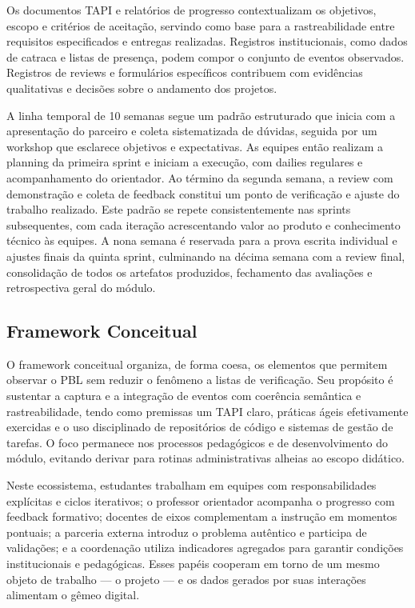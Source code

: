 \documentclass[12pt,a4paper]{article}
\begin{document}
Os documentos TAPI e relatórios de progresso contextualizam os objetivos, escopo e critérios de aceitação, servindo como base para a rastreabilidade entre requisitos especificados e entregas realizadas. Registros institucionais, como dados de catraca e listas de presença, podem compor o conjunto de eventos observados. Registros de reviews e formulários específicos contribuem com evidências qualitativas e decisões sobre o andamento dos projetos.

A linha temporal de 10 semanas segue um padrão estruturado que inicia com a apresentação do parceiro e coleta sistematizada de dúvidas, seguida por um workshop que esclarece objetivos e expectativas. As equipes então realizam a planning da primeira sprint e iniciam a execução, com dailies regulares e acompanhamento do orientador. Ao término da segunda semana, a review com demonstração e coleta de feedback constitui um ponto de verificação e ajuste do trabalho realizado. Este padrão se repete consistentemente nas sprints subsequentes, com cada iteração acrescentando valor ao produto e conhecimento técnico às equipes. A nona semana é reservada para a prova escrita individual e ajustes finais da quinta sprint, culminando na décima semana com a review final, consolidação de todos os artefatos produzidos, fechamento das avaliações e retrospectiva geral do módulo.

\subsection{Framework Conceitual}

O framework conceitual organiza, de forma coesa, os elementos que permitem observar o PBL sem reduzir o fenômeno a listas de verificação. Seu propósito é sustentar a captura e a integração de eventos com coerência semântica e rastreabilidade, tendo como premissas um TAPI claro, práticas ágeis efetivamente exercidas e o uso disciplinado de repositórios de código e sistemas de gestão de tarefas. O foco permanece nos processos pedagógicos e de desenvolvimento do módulo, evitando derivar para rotinas administrativas alheias ao escopo didático.

Neste ecossistema, estudantes trabalham em equipes com responsabilidades explícitas e ciclos iterativos; o professor orientador acompanha o progresso com feedback formativo; docentes de eixos complementam a instrução em momentos pontuais; a parceria externa introduz o problema autêntico e participa de validações; e a coordenação utiliza indicadores agregados para garantir condições institucionais e pedagógicas. Esses papéis cooperam em torno de um mesmo objeto de trabalho — o projeto — e os dados gerados por suas interações alimentam o gêmeo digital.
\end{document}
